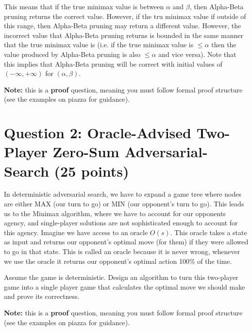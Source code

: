 \documentclass[11pt]{article}
\newcommand{\question}[1]{\section*{\normalsize #1}}
\begin{document}
\noindent This means that if the true minimax value is between $\alpha$ and $\beta$, then Alpha-Beta pruning returns the correct value. However, if the tru minimax value if outside of this range, then Alpha-Beta pruning may return a different value. However, the incorrect value that Alpha-Beta pruning returns is bounded in the same manner that the true minimax value is (i.e. if the true minimax value is $\le \alpha$ then the value produced by Alpha-Beta pruning is also $\le \alpha$ and vice versa). Note that this implies that Alpha-Beta pruning will be correct with initial values of $(-\infty, +\infty)$ for $(\alpha, \beta)$.\newline\newline



\noindent\textbf{Note:} this is a \textbf{proof} question, meaning you must follow formal proof structure (see the examples on piazza for guidance).\newpage















\question{Question 2: Oracle-Advised Two-Player Zero-Sum Adversarial-Search  (25 points)}
In deterministic adversarial search, we have to expand a game tree where nodes are either MAX (our turn to go) or MIN (our opponent's turn to go). This leads us to the Minimax algorithm, where we have to account for our opponents agency, and single-player solutions are not sophisticated enough to account for this agency. Imagine we have access to an oracle $O(s)$. This oracle takes a state as input and returns our opponent's optimal move (for them) if they were allowed to go in that state. This is called an oracle because it is never wrong, whenever we use the oracle it returns our opponent's optimal action 100\% of the time.\newline

\noindent Assume the game is deterministic. Design an algorithm to turn this two-player game into a single player game that calculates the optimal move we should make and prove its correctness.\newline

\noindent\textbf{Note:} this is a \textbf{proof} question, meaning you must follow formal proof structure (see the examples on piazza for guidance).
\newpage
\end{document}
